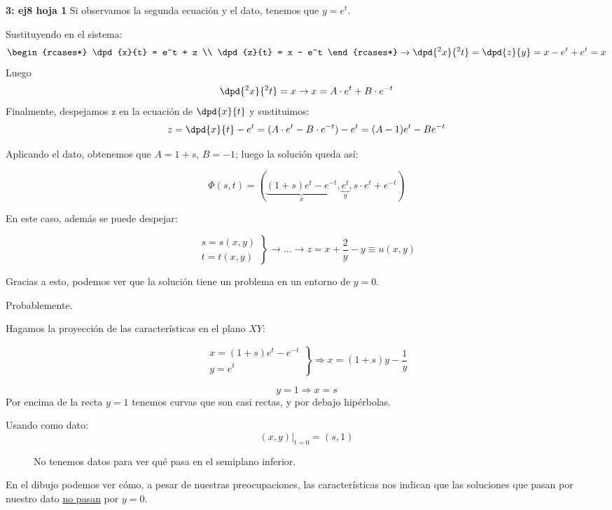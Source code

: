 \begin{example}{\bf3: ej8 hoja 1}
		Si observamos la segunda ecuación y el dato, tenemos que $ y = e^t $.

		Sustituyendo en el sistema:
		\[
		\begin{rcases*}
			 \dpd{x}{t} = e^t + z  \\
			 \dpd{z}{t} = x - e^t
		\end{rcases*}
		\rightarrow \dpd{^2 x}{^2 t} = \dpd{z}{y} = x - e^t + e^t = x
		\]
		Luego
		$$\dpd{^2 x}{^2 t} = x \rightarrow x = A \cdot e^t + B \cdot e^{-t}$$
		Finalmente, despejamos z en la ecuación de $\dpd{x}{t}$ y sustituimos:
		$$z = \dpd{x}{t} - e^t = (A \cdot e^t - B \cdot e^{-t}) - e^t = (A-1)e^t - B e^{-t}$$

		Aplicando el dato, obtenemos que $A=1+s$, $B=-1$; luego la solución queda así:

		\[ \Phi(s,t) = (\underbrace{(1+s)e^t-e^{-t}}_{x},\underbrace{e^t}_{y}, s\cdot e^t + e^{-t}) \]

		En este caso, además se puede despejar:

		\[  \left. \begin{array}{r}
		s = s(x,y) \\
		t = t(x,y)
		\end{array}
		\right\}\rightarrow \dots \rightarrow z = x + \frac{2}{y} - y \equiv u(x,y)
		\]

		Gracias a esto, podemos ver que la solución tiene un problema en un entorno de ${y = 0}$.

		 Probablemente.

		Hagamos la proyección de las características en el plano $XY$:

		\[
		\left.
		\begin{array}{l}
			x = (1+s)e^t - e^{-t} \\
			y = e^{t}
		\end{array}
		\right\}
		\Rightarrow x = (1+s) y - \frac{1}{y}
		\]

		\[ y = 1 \Rightarrow x = s \] Por encima de la recta $y=1$ tenemos curvas que son casi rectas, y por debajo hipérbolas.

		Usando como dato: \[ (x,y) |_{t=0} = (s,1) \]

		\begin{figure}[hbtp]
			\caption{No tenemos datos para ver qué pasa en el semiplano inferior.}
			\label{fig:Ejemplo-3-feb-09-proy-XY}
		\end{figure}

		En el dibujo podemos ver cómo, a pesar de nuestras preocupaciones, las características nos indican que las soluciones que pasan por nuestro dato \underline{no pasan} por $y=0$.

	\end{example}


